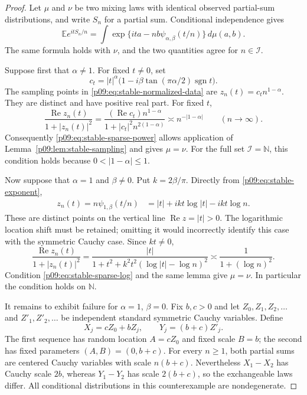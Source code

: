 \documentclass[11pt,letterpaper]{article}
\theoremstyle{definition}
\theoremstyle{remark}
\newcommand{\1}{\mathbf 1}
\begin{document}
\begin{proof}
Let $\mu$ and $\nu$ be two mixing laws with identical observed
partial-sum distributions, and write $S_n$ for a partial sum.
Conditional independence gives
\begin{equation}\label{p09:eq:stable-normalized-data}
 \mathbb E e^{itS_n/n}
   =\int\exp\{ita-nb\psi_{\alpha,\beta}(t/n)\}\,d\mu(a,b).
\end{equation}
The same formula holds with $\nu$, and the two quantities agree for
$n\in\mathcal I$.

Suppose first that $\alpha\ne1$.
For fixed $t\ne0$, set
\[
 c_t=|t|^\alpha
       \bigl(1-i\beta\tan(\pi\alpha/2)\operatorname{sgn}t\bigr).
\]
The sampling points in \eqref{p09:eq:stable-normalized-data} are
$z_n(t)=c_t n^{1-\alpha}$.
They are distinct and have positive real part.  For fixed $t$,
\[
 \frac{\operatorname{Re}z_n(t)}{1+|z_n(t)|^2}
 =\frac{(\operatorname{Re}c_t)n^{1-\alpha}}
         {1+|c_t|^2 n^{2(1-\alpha)}}
 \asymp n^{-|1-\alpha|}\qquad(n\to\infty).
\]
Consequently \eqref{p09:eq:stable-sparse-power} allows application of
Lemma~\ref{p09:lem:stable-sampling} and gives $\mu=\nu$.
For the full set $\mathcal I=\mathbb N$, this condition holds because
$0<|1-\alpha|\leq1$.

Now suppose that $\alpha=1$ and $\beta\ne0$.
Put $k=2\beta/\pi$.  Directly from \eqref{p09:eq:stable-exponent},
\begin{align*}
 z_n(t)=n\psi_{1,\beta}(t/n)
 &=|t|+ikt\log|t|-ikt\log n.
\end{align*}
These are distinct points on the vertical line
$\operatorname{Re}z=|t|>0$.  The logarithmic location shift must be
retained; omitting it would incorrectly identify this case with the
symmetric Cauchy case.  Since $kt\ne0$,
\[
 \frac{\operatorname{Re}z_n(t)}{1+|z_n(t)|^2}
  =\frac{|t|}{1+t^2+k^2t^2(\log|t|-\log n)^2}
  \asymp\frac{1}{1+(\log n)^2}.
\]
Condition \eqref{p09:eq:stable-sparse-log} and the same lemma give $\mu=\nu$.
In particular the condition holds on $\mathbb N$.

It remains to exhibit failure for $\alpha=1$, $\beta=0$.
Fix $b,c>0$ and let $Z_0,Z_1,Z_2,\ldots$ and
$Z'_1,Z'_2,\ldots$ be independent standard symmetric Cauchy variables.
Define
\[
 X_j=cZ_0+bZ_j,\qquad Y_j=(b+c)Z'_j.
\]
The first sequence has random location $A=cZ_0$ and fixed scale $B=b$;
the second has fixed parameters $(A,B)=(0,b+c)$.
For every $n\geq1$, both partial sums are centered Cauchy variables
with scale $n(b+c)$.  Nevertheless $X_1-X_2$ has Cauchy scale $2b$,
whereas $Y_1-Y_2$ has scale $2(b+c)$, so the exchangeable laws differ.
All conditional distributions in this counterexample are nondegenerate.
\end{proof}
\end{document}
